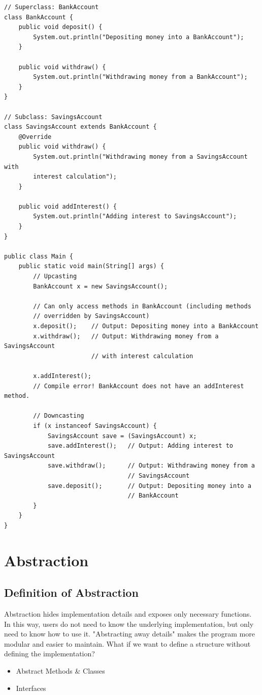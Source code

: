 \documentclass[letterpaper,12pt]{article}
\begin{document}
\begin{verbatim}
// Superclass: BankAccount
class BankAccount {
    public void deposit() {
        System.out.println("Depositing money into a BankAccount");
    }

    public void withdraw() {
        System.out.println("Withdrawing money from a BankAccount");
    }
}

// Subclass: SavingsAccount
class SavingsAccount extends BankAccount {
    @Override
    public void withdraw() {
        System.out.println("Withdrawing money from a SavingsAccount with
        interest calculation");
    }

    public void addInterest() {
        System.out.println("Adding interest to SavingsAccount");
    }
}

public class Main {
    public static void main(String[] args) {
        // Upcasting
        BankAccount x = new SavingsAccount();  

        // Can only access methods in BankAccount (including methods
        // overridden by SavingsAccount)
        x.deposit();    // Output: Depositing money into a BankAccount
        x.withdraw();   // Output: Withdrawing money from a SavingsAccount 
                        // with interest calculation

        x.addInterest();
        // Compile error! BankAccount does not have an addInterest method.

        // Downcasting
        if (x instanceof SavingsAccount) {
            SavingsAccount save = (SavingsAccount) x;
            save.addInterest();   // Output: Adding interest to SavingsAccount
            save.withdraw();      // Output: Withdrawing money from a 
                                  // SavingsAccount
            save.deposit();       // Output: Depositing money into a 
                                  // BankAccount
        }
    }
}
\end{verbatim}

\section{Abstraction}
\subsection{Definition of Abstraction}
Abstraction hides implementation details and exposes only necessary functions. In this way, users do not need to know the underlying implementation, but only need to know how to use it. "Abstracting away details" makes the program more modular and easier to maintain. What if we want to define a structure without defining the
implementation?
\begin{itemize}
    \item Abstract Methods \& Classes
    \item Interfaces
\end{itemize}
\end{document}
